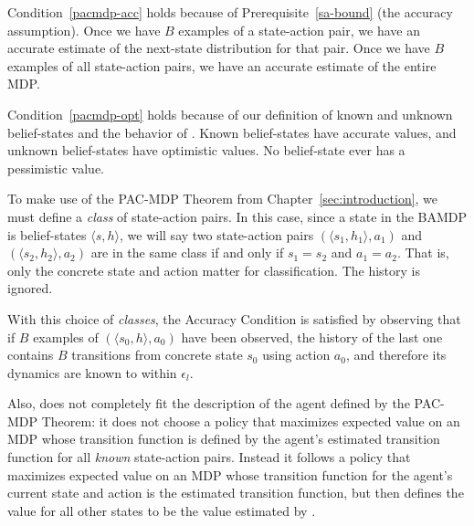 Condition~\ref{pacmdp-acc} holds because of Prerequisite~\ref{sa-bound} (the accuracy assumption). Once we have $B$ examples of a state-action pair, we have an accurate estimate of the next-state distribution for that pair. Once we have $B$ examples of all state-action pairs, we have an accurate estimate of the entire MDP.


Condition~\ref{pacmdp-opt} holds because of our definition of known and unknown belief-states and the behavior of . Known belief-states have accurate values, and unknown belief-states have optimistic values. No belief-state ever has a pessimistic value.

To make use of the PAC-MDP Theorem from Chapter~\ref{sec:introduction}, we must define a \emph{class} of state-action pairs. In this case, since a state in the BAMDP is belief-states $\langle s, h \rangle$, we will say two state-action pairs $(\langle s_1, h_1 \rangle, a_1)$ and $(\langle s_2, h_2 \rangle, a_2)$ are in the same class if and only if $s_1=s_2$ and $a_1=a_2$. That is, only the concrete state and action matter for classification. The history is ignored.

With this choice of \emph{classes}, the Accuracy Condition is satisfied by observing that if $B$ examples of $(\langle s_0, h \rangle,a_0)$ have been observed, the history of the last one contains $B$ transitions from concrete state $s_0$ using action $a_0$, and therefore its dynamics are known to within $\epsilon_l$.

Also,  does not completely fit the description of the agent defined by the PAC-MDP Theorem: it does not choose a policy that maximizes expected value on an MDP whose transition function is defined by the agent's estimated transition function for all \emph{known} state-action pairs. Instead it follows a policy that maximizes expected value on an MDP whose transition function for the agent's current state and action is the estimated transition function, but then defines the value for all other states to be the value estimated by .

